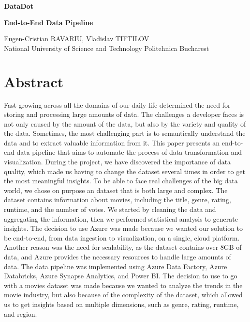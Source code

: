 \documentclass[a4paper,12pt]{article}
\author{Eugen-Cristian RAVARIU, Vladislav TIFTILOV}
\begin{document}
\begin{titlepage}
    \centering
    {\bfseries\fontsize{14pt}{14pt} DataDot}\par
    \vspace{0.5cm}
    {\bfseries\fontsize{12pt}{12pt} End-to-End Data Pipeline}\par
    \vspace{1cm}
    Eugen-Cristian RAVARIU, Vladislav TIFTILOV\\
    National University of Science and Technology Politehnica Bucharest\\
    \vfill
    \date{\today}
\end{titlepage}

\section{Abstract}
\label{sec:abstract}

Fast growing across all the domains of our daily life determined the need for storing and processing 
large amounts of data. The challenges a developer faces is not only caused by the amount of the data,
but also by the variety and quality of the data. Sometimes, the most challenging part is to semantically
understand the data and to extract valuable information from it. This paper presents an end-to-end data
pipeline that aims to automate the process of data transformation and visualization. During the project,
we have discovered the importance of data quality, which made us having to change the dataset several times
in order to get the most meaningful insights. To be able to face real challenges of the big data world, we
chose on purpose an dataset that is both large and complex. The dataset contains information about movies,
including the title, genre, rating, runtime, and the number of votes. We started by cleaning the data and
aggregating the information, then we performed statistical analysis to generate insights. The decision to
use Azure was made because we wanted our solution to be end-to-end, from data ingestion to visualization, on
a single, cloud platform. Another reason was the need for scalability, as the dataset contains over 8GB of data,
and Azure provides the necessary resources to handle large amounts of data. The data pipeline was implemented
using Azure Data Factory, Azure Databricks, Azure Synapse Analytics, and Power BI. The decision to use to
go with a movies dataset was made because we wanted to analyze the trends in the movie industry, but also
because of the complexity of the dataset, which allowed us to get insights based on multiple dimensions, such
as genre, rating, runtime, and region.
\end{document}
